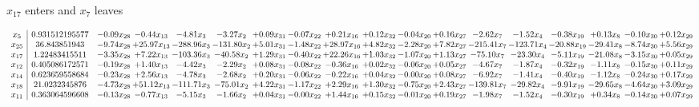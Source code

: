 \documentclass[9pt]{article}
\begin{document}
 $ x_{17} $ enters and $ x_{7} $ leaves 

 \[\begin{array}{c| c c@{\hskip 2pt} c@{\hskip 2pt} c@{\hskip 2pt} c@{\hskip 2pt} c@{\hskip 2pt} c@{\hskip 2pt} c@{\hskip 2pt} c@{\hskip 2pt} c@{\hskip 2pt} c@{\hskip 2pt} c@{\hskip 2pt} c@{\hskip 2pt} c@{\hskip 2pt} c@{\hskip 2pt} c@{\hskip 2pt} c@{\hskip 2pt} }
 x_{5}   &  0.931512195577 & -0.09 x_{28} & -0.44 x_{13} & -4.81 x_{3} & -3.27 x_{2} & +  0.09 x_{31} & -0.07 x_{22} & +  0.21 x_{16} & +  0.12 x_{32} & -0.04 x_{20} & +  0.16 x_{27} & -2.62 x_{7} & -1.52 x_{4} & -0.38 x_{19} & +  0.13 x_{8} & -0.10 x_{30} & +  0.12 x_{29}\\
 x_{25}   &  36.843851943 & -9.74 x_{28} & + 25.97 x_{13} & -288.96 x_{3} & -131.80 x_{2} & +  5.01 x_{31} & -1.48 x_{22} & + 28.97 x_{16} & +  4.82 x_{32} & -2.28 x_{20} & +  7.82 x_{27} & -215.41 x_{7} & -123.71 x_{4} & -20.88 x_{19} & -29.41 x_{8} & -8.74 x_{30} & +  5.56 x_{29}\\
 x_{17}   &  1.22483415511 & -3.35 x_{28} & +  7.22 x_{13} & -103.36 x_{3} & -40.58 x_{2} & +  1.29 x_{31} & -0.40 x_{22} & + 22.26 x_{16} & +  1.03 x_{32} & -1.07 x_{20} & +  1.13 x_{27} & -75.10 x_{7} & -23.30 x_{4} & -5.11 x_{19} & -21.08 x_{8} & -3.15 x_{30} & +  0.05 x_{29}\\
 x_{12}   &  0.405086172571 & -0.19 x_{28} & +  1.40 x_{13} & -4.42 x_{3} & -2.29 x_{2} & +  0.08 x_{31} & -0.08 x_{22} & -0.36 x_{16} & +  0.02 x_{32} & -0.06 x_{20} & +  0.05 x_{27} & -4.67 x_{7} & -1.87 x_{4} & -0.32 x_{19} & -1.11 x_{8} & -0.15 x_{30} & +  0.11 x_{29}\\
 x_{14}   &  0.623659558684 & -0.23 x_{28} & +  2.56 x_{13} & -4.78 x_{3} & -2.68 x_{2} & +  0.20 x_{31} & -0.06 x_{22} & -0.22 x_{16} & +  0.04 x_{32} & -0.00 x_{20} & +  0.08 x_{27} & -6.92 x_{7} & -1.41 x_{4} & -0.40 x_{19} & -1.12 x_{8} & -0.24 x_{30} & +  0.17 x_{29}\\
 x_{18}   &  21.0232345876 & -4.73 x_{28} & + 51.12 x_{13} & -111.71 x_{3} & -75.01 x_{2} & +  4.22 x_{31} & -1.17 x_{22} & +  2.29 x_{16} & +  1.30 x_{32} & -0.75 x_{20} & +  2.43 x_{27} & -139.81 x_{7} & -29.82 x_{4} & -9.91 x_{19} & -29.65 x_{8} & -4.64 x_{30} & +  3.09 x_{29}\\
 x_{11}   &  0.363064596608 & -0.13 x_{28} & -0.77 x_{13} & -5.15 x_{3} & -1.66 x_{2} & +  0.04 x_{31} & -0.00 x_{22} & +  1.44 x_{16} & +  0.15 x_{32} & -0.01 x_{20} & +  0.19 x_{27} & -1.98 x_{7} & -1.52 x_{4} & -0.30 x_{19} & +  0.34 x_{8} & -0.14 x_{30} & +  0.07 x_{29}\\

\end{array}\]
\end{document}
